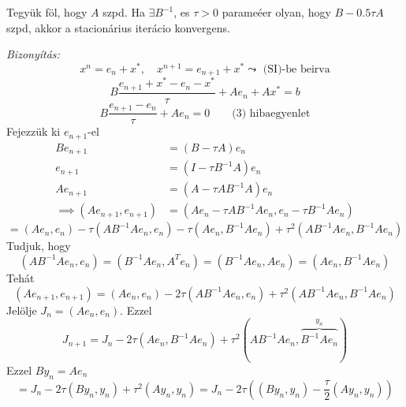 \begin{allitas}
    Tegyük föl, hogy $A$ szpd. Ha $\exists B^{-1}$, es $\tau > 0$  parameéer olyan, hogy $B - 0.5 \tau A$ szpd, akkor a stacionárius iterácio konvergens.
\end{allitas}
\textit{Bizonyítás:}
\begin{equation*}
    x^{n} = e_{n} + x^{*}, \quad x^{n+1} = e_{n+1} + x^{*} \leadsto \text{ (SI)-be beirva}
\end{equation*}
\begin{equation*}
    B \frac{e_{n+1} + x^{*} - e_{n} - x^{*}}{\tau} + Ae_{n} + Ax^{*} = b
\end{equation*}
\begin{equation*}
    B \frac{e_{n+1} - e_{n}}{\tau} + Ae_{n} = 0 \qquad \text{(3) hibaegyenlet}
\end{equation*}
Fejezzük ki $e_{n+1}$-el
\begin{align*}
    Be_{n+1} & = (B - \tau A)e_{n} \\
    e_{n+1} & = (I - \tau B^{-1}A)e_{n} \\
    Ae_{n+1} & = (A - \tau AB^{-1}A)e_{n} \\
    \implies (Ae_{n+1}, e_{n+1}) & = (Ae_{n} - \tau AB^{-1}Ae_{n}, e_{n} - \tau B^{-1}Ae_{n})
\end{align*}
\begin{equation*}
    = (Ae_{n}, e_{n}) - \tau(AB^{-1}Ae_{n}, e_{n}) - \tau(Ae_{n}, B^{-1}Ae_{n}) + \tau ^{2}(AB^{-1}Ae_{n}, B^{-1}Ae_{n})
\end{equation*}
Tudjuk, hogy
\begin{equation*}
    (AB^{-1}Ae_{n}, e_{n}) = (B^{-1}Ae_{n}, A^{T}e_{n}) = (B^{-1}Ae_{n}, Ae_{n}) = (Ae_{n}, B^{-1}Ae_{n})
\end{equation*}
Tehát
\begin{equation*}
    (Ae_{n+1},e_{n+1}) = (Ae_{n}, e_{n}) - 2\tau(AB^{-1}Ae_{n}, e_{n}) + \tau ^{2}(AB^{-1}Ae_{n}, B^{-1}Ae_{n})
\end{equation*}
Jelölje $J_{n} = (Ae_{n}, e_{n})$. Ezzel
\begin{equation*}
    J_{n+1} = J_{n} - 2\tau(Ae_{n}, B^{-1}Ae_{n}) + \tau ^{2}(AB^{-1}Ae_{n}, \stackrel{y_{n}}{\overbrace{ B^{-1}Ae_{n}}})
\end{equation*}
Ezzel $By_{n} = Ae_{n}$
\begin{equation*}
    = J_{n} - 2\tau(By_{n}, y_{n}) + \tau ^{2} (Ay_{n}, y_{n}) = J_{n} - 2\tau \left( (By_{n}, y_{n}) - \frac{\tau}{2}(Ay_{n}, y_{n}) \right)
\end{equation*}
